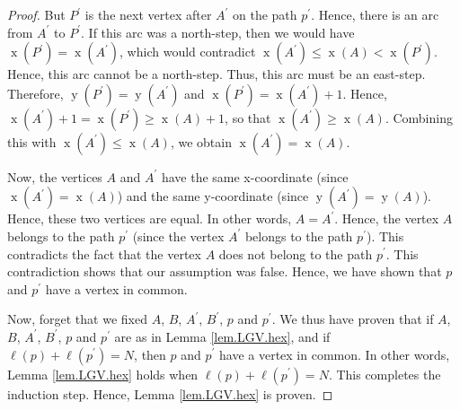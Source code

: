 \documentclass[reqno]{amsart}%
\newcommand{\0}{\phantom{c}}
\theoremstyle{plain}
\theoremstyle{definition}
\numberwithin{equation}{section}
\begin{document}
\begin{proof}
But $P^{\prime}$ is the next vertex after $A^{\prime}$ on the path $p^{\prime
}$. Hence, there is an arc from $A^{\prime}$ to $P^{\prime}$. If this arc was
a north-step, then we would have $\operatorname*{x}\left(  P^{\prime}\right)
=\operatorname*{x}\left(  A^{\prime}\right)  $, which would contradict
$\operatorname*{x}\left(  A^{\prime}\right)  \leq\operatorname*{x}\left(
A\right)  <\operatorname*{x}\left(  P^{\prime}\right)  $. Hence, this arc
cannot be a north-step. Thus, this arc must be an east-step. Therefore,
$\operatorname*{y}\left(  P^{\prime}\right)  =\operatorname*{y}\left(
A^{\prime}\right)  $ and $\operatorname*{x}\left(  P^{\prime}\right)
=\operatorname*{x}\left(  A^{\prime}\right)  +1$. Hence, $\operatorname*{x}%
\left(  A^{\prime}\right)  +1=\operatorname*{x}\left(  P^{\prime}\right)
\geq\operatorname*{x}\left(  A\right)  +1$, so that $\operatorname*{x}\left(
A^{\prime}\right)  \geq\operatorname*{x}\left(  A\right)  $. Combining this
with $\operatorname*{x}\left(  A^{\prime}\right)  \leq\operatorname*{x}\left(
A\right)  $, we obtain $\operatorname*{x}\left(  A^{\prime}\right)
=\operatorname*{x}\left(  A\right)  $.

Now, the vertices $A$ and $A^{\prime}$ have the same x-coordinate (since
$\operatorname*{x}\left(  A^{\prime}\right)  =\operatorname*{x}\left(
A\right)  $) and the same y-coordinate (since $\operatorname*{y}\left(
A^{\prime}\right)  =\operatorname*{y}\left(  A\right)  $). Hence, these two
vertices are equal. In other words, $A=A^{\prime}$. Hence, the vertex $A$
belongs to the path $p^{\prime}$ (since the vertex $A^{\prime}$ belongs to the
path $p^{\prime}$). This contradicts the fact that the vertex $A$ does not
belong to the path $p^{\prime}$. This contradiction shows that our assumption
was false. Hence, we have shown that $p$ and $p^{\prime}$ have a vertex in common.

Now, forget that we fixed $A$, $B$, $A^{\prime}$, $B^{\prime}$, $p$ and
$p^{\prime}$. We thus have proven that if $A$, $B$, $A^{\prime}$, $B^{\prime}%
$, $p$ and $p^{\prime}$ are as in Lemma \ref{lem.LGV.hex}, and if $\ell\left(
p\right)  +\ell\left(  p^{\prime}\right)  =N$, then $p$ and $p^{\prime}$ have
a vertex in common. In other words, Lemma \ref{lem.LGV.hex} holds when
$\ell\left(  p\right)  +\ell\left(  p^{\prime}\right)  =N$. This completes the
induction step. Hence, Lemma \ref{lem.LGV.hex} is proven.
\end{proof}
\end{document}
